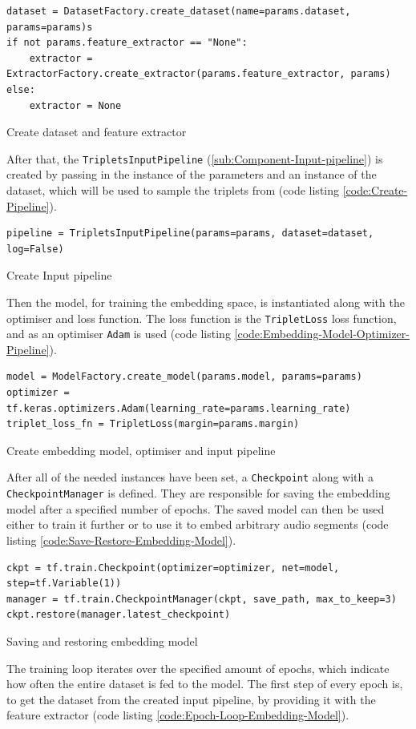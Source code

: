 \begin{code}[H]
\begin{verbatim}
dataset = DatasetFactory.create_dataset(name=params.dataset, params=params)s
if not params.feature_extractor == "None":
    extractor = ExtractorFactory.create_extractor(params.feature_extractor, params)
else:
    extractor = None
\end{verbatim}
\caption{Create dataset and feature extractor}
\label{code:Create-Dataset-Extractor}
\end{code}
\noindent
After that, the \texttt{TripletsInputPipeline} (\ref{sub:Component-Input-pipeline}) is created by passing in the instance of the parameters and an instance of the dataset, which will be used to sample the triplets from (code listing \ref{code:Create-Pipeline}).

\begin{code}[H]
\begin{verbatim}
pipeline = TripletsInputPipeline(params=params, dataset=dataset, log=False)
\end{verbatim}
\caption{Create Input pipeline}
\label{code:Create-Pipeline}
\end{code}
\noindent
Then the model, for training the embedding space, is instantiated along with the optimiser and loss function. The loss function is the \texttt{TripletLoss} loss function, and as an optimiser \texttt{Adam} is used (code listing \ref{code:Embedding-Model-Optimizer-Pipeline}).

\begin{code}[H]
\begin{verbatim}
model = ModelFactory.create_model(params.model, params=params)
optimizer = tf.keras.optimizers.Adam(learning_rate=params.learning_rate)
triplet_loss_fn = TripletLoss(margin=params.margin)
\end{verbatim}
\caption{Create embedding model, optimiser and input pipeline}
\label{code:Embedding-Model-Optimizer-Pipeline}
\end{code}
\noindent
After all of the needed instances have been set, a \texttt{Checkpoint} along with a \texttt{CheckpointManager} is defined. They are responsible for saving the embedding model after a specified number of epochs. The saved model can then be used either to train it further or to use it to embed arbitrary audio segments (code listing \ref{code:Save-Restore-Embedding-Model}).

\begin{code}[H]
\begin{verbatim}
ckpt = tf.train.Checkpoint(optimizer=optimizer, net=model, step=tf.Variable(1))
manager = tf.train.CheckpointManager(ckpt, save_path, max_to_keep=3)
ckpt.restore(manager.latest_checkpoint)
\end{verbatim}
\caption{Saving and restoring embedding model}
\label{code:Save-Restore-Embedding-Model}
\end{code}
\noindent
The training loop iterates over the specified amount of epochs, which indicate how often the entire dataset is fed to the model. The first step of every epoch is, to get the dataset from the created input pipeline, by providing it with the feature extractor (code listing \ref{code:Epoch-Loop-Embedding-Model}).

